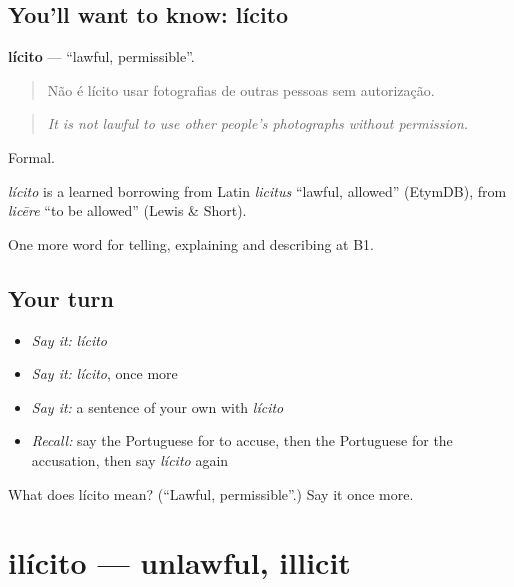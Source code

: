 \subsection*{You'll want to know: lícito}
\textbf{lícito} — \textquotedblleft{}lawful, permissible\textquotedblright{}.

\begin{quote}
Não é lícito usar fotografias de outras pessoas sem autorização.
\end{quote}

\begin{quote}
\emph{It is not lawful to use other people's photographs without permission.}
\end{quote}

Formal.

\begin{cousinweb}
\emph{lícito} is a learned borrowing from Latin \emph{licitus} \textquotedblleft{}lawful, allowed\textquotedblright{} (EtymDB), from \emph{licēre} \textquotedblleft{}to be allowed\textquotedblright{} (Lewis \& Short).
\end{cousinweb}

\begin{grammarlens}[title={What you've built}]
One more word for telling, explaining and describing at B1.
\end{grammarlens}

\subsection*{Your turn}
\begin{itemize}
\raggedright
  \item \emph{Say it:} \emph{lícito}
  \item \emph{Say it:} \emph{lícito}, once more
  \item \emph{Say it:} a sentence of your own with \emph{lícito}
  \item \emph{Recall:} say the Portuguese for to accuse, then the Portuguese for the accusation, then say \emph{lícito} again
\end{itemize}

\begin{tcolorbox}[breakable,colback=teal!4,colframe=teal!35!black,title={Before you move on}]
What does lícito mean? (\textquotedblleft{}Lawful, permissible\textquotedblright{}.) Say it once more.
\end{tcolorbox}
\section[ilícito]{ilícito — unlawful, illicit}


